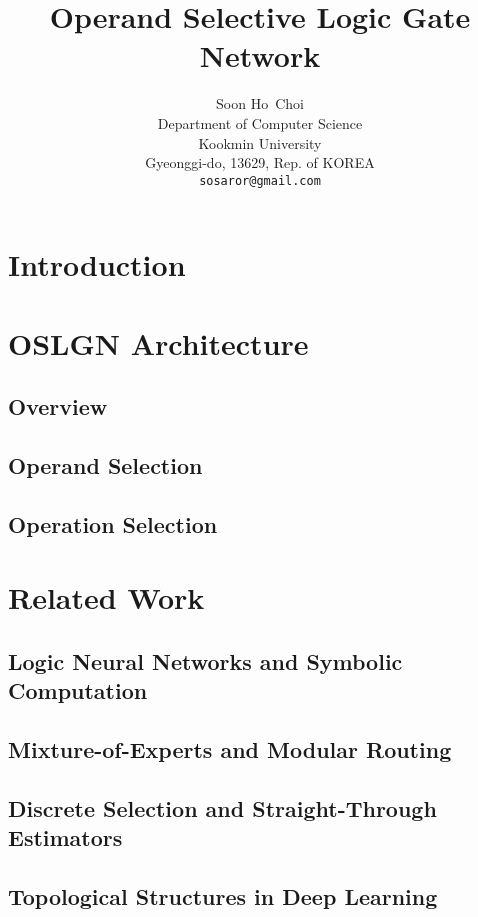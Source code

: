 \documentclass{article}
\title{Operand Selective Logic Gate Network}
\author{%
  Soon Ho~Choi\\
  Department of Computer Science\\
  Kookmin University\\
  Gyeonggi-do, 13629, Rep. of KOREA \\
  \texttt{sosaror@gmail.com} \\
}
\begin{document}
\maketitle



\section{Introduction}
  
\section{OSLGN Architecture}
  \subsection{Overview}
    
  \subsection{Operand Selection}
    
  \subsection{Operation Selection}
    
\section{Related Work}
  \subsection{Logic Neural Networks and Symbolic Computation}
    
  \subsection{Mixture-of-Experts and Modular Routing}
    
  \subsection{Discrete Selection and Straight-Through Estimators}
    
  \subsection{Topological Structures in Deep Learning}
    
\end{document}
